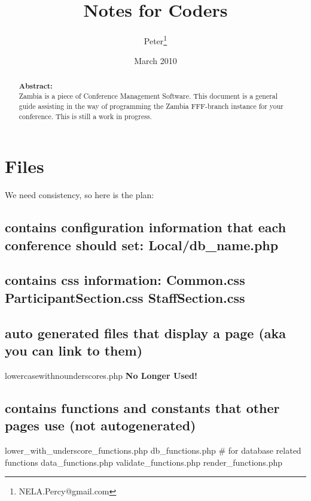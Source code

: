 \documentclass[captions=tablesignature]{scrartcl}
\author{Peter\thanks{NELA.Percy@gmail.com}}
\date{March 2010}
\title{Notes for Coders}
\begin{document}
\maketitle
{}
\thispagestyle{fancy}
\renewcommand{\headrulewidth}{0pt}
\renewcommand{\footrulewidth}{0pt}
\lhead{}
\rhead{}
\chead{}
\lfoot{}
\cfoot{}
\rfoot{}
\begin{abstract}
\vspace{5cm}
{\LARGE{\textbf{Abstract:\\}}}
Zambia is a piece of Conference Management Software.  This document is a general guide assisting in the way of programming the Zambia FFF-branch instance for your conference.  This is still a work in progress.
\end{abstract}
\newpage
\renewcommand{\headrulewidth}{1pt}
\renewcommand{\footrulewidth}{1pt}
\rfoot{\thepage}
\setcounter{tocdepth}{3}
\tableofcontents
\newpage
{}
\section{Files}
\label{sec-1}
We need consistency, so here is the plan:
\subsection{contains configuration information that each conference should set: Local/db\_name.php}
\label{sec-1-1}

\subsection{contains css information: Common.css  ParticipantSection.css  StaffSection.css}
\label{sec-1-2}

\subsection{auto generated files that display a page (aka you can link to them)}
\label{sec-1-3}
lowercasewithnounderscores.php
\textbf{No Longer Used!}
\subsection{contains functions and constants that other pages use (not autogenerated)}
\label{sec-1-4}
lower\_with\_underscore\_functions.php
db\_functions.php           \# for database related functions
data\_functions.php
validate\_functions.php
render\_functions.php
\end{document}
